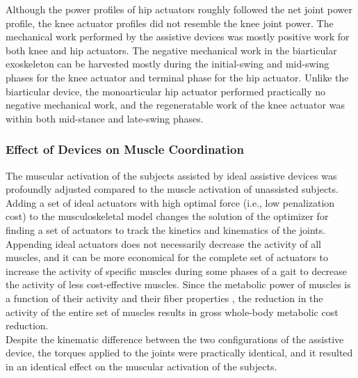 \documentclass[10pt,letterpaper]{article}
\begin{document}
Although the power profiles of hip actuators roughly followed the net joint power profile, the knee actuator profiles did not resemble the knee joint power. The mechanical work performed by the assistive devices was mostly positive work for both knee and hip actuators. The negative mechanical work in the biarticular exoskeleton can be harvested mostly during the initial-swing and mid-swing phases for the knee actuator and terminal phase for the hip actuator. Unlike the biarticular device, the monoarticular hip actuator performed practically no negative mechanical work, and the regeneratable work of the knee actuator was within both mid-stance and late-swing phases.
\subsubsection*{Effect of Devices on Muscle Coordination}
The muscular activation of the subjects assisted by ideal assistive devices was profoundly adjusted compared to the muscle activation of unassisted subjects. Adding a set of ideal actuators with high optimal force (i.e., low penalization cost) to the musculoskeletal model changes the solution of the optimizer for finding a set of actuators to track the kinetics and kinematics of the joints.\\
Appending ideal actuators does not necessarily decrease the activity of all muscles, and it can be more economical for the complete set of actuators to increase the activity of specific muscles during some phases of a gait to decrease the activity of less cost-effective muscles. Since the metabolic power of muscles is a function of their activity and their fiber properties \cite{106}, the reduction in the activity of the entire set of muscles results in gross whole-body metabolic cost reduction.\\
Despite the kinematic difference between the two configurations of the assistive device, the torques applied to the joints were practically identical, and it resulted in an identical effect on the muscular activation of the subjects.\\
\end{document}
